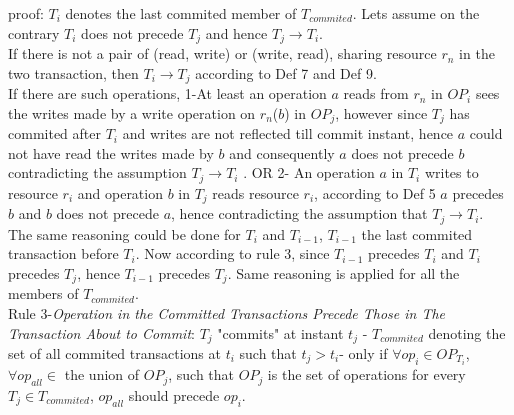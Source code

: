 \documentclass[a4paper, 11pt]{article}
\begin{document}
proof: $T_i$ denotes the last commited member of $T_{commited}$. Lets assume on the contrary $T_i$ does not precede $T_j$ and hence $T_j \rightarrow T_i$.\\

If there is not a pair of (read, write) or (write, read), sharing resource $r_n$ in the two transaction, then $T_i \rightarrow T_j$ according to Def 7 and Def 9.\\

If there are such operations, 1-At least an operation $a$ reads from $r_n$ in $OP_i$ sees the writes made by a write operation on $r_n$($b$) in $OP_j$, however since $T_j$ has commited after $T_i$ and writes are not reflected till commit instant, hence $a$ could not have read the writes made by $b$ and consequently $a$ does not precede $b$ contradicting the assumption $T_j \rightarrow T_i$ . OR 2- An operation $a$ in $T_i$ writes to resource $r_i$ and operation $b$ in $T_j$ reads resource $r_i$, according to Def 5 $a$ precedes $b$ and $b$ does not precede $a$, hence contradicting the assumption that $T_j \rightarrow T_i$.\\ 


The same reasoning could be done for $T_i$ and $T_{i-1}$, $T_{i-1}$ the last commited transaction before $T_{i}$. Now according to rule 3, since $T_{i-1}$ precedes $T_i$ and $T_i$ precedes $T_{j}$, hence $T_{i-1}$ precedes $T_{j}$. Same reasoning is applied for all the members of $T_{commited}$. \\





Rule 3-\emph{Operation in the Committed Transactions Precede Those in The Transaction About to Commit}: $T_j$ "commits" at instant $t_j$ - $T_{commited}$ denoting the set of all commited transactions at $t_i$ such that $t_j > t_i$- only if $\forall op_i \in OP_{T_i}$, $\forall op_{all} \in$ the union of $OP_j$, such that $OP_j$ is the set of operations  for every $T_j \in T_{commited}$, $op_{all}$  should precede $op_{i}$.\\
\end{document}
